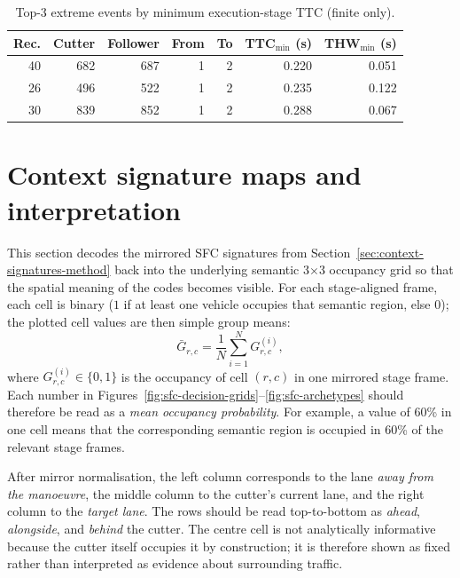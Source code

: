 \documentclass[12pt,a4paper,twoside,openright]{report}
\begin{document}
    \begin{table}[H]
        \centering
        \caption{Top-3 extreme events by minimum execution-stage TTC (finite only).}
        \label{tab:top-ttc}
        \begin{tabular}{@{}rrrrrrr@{}}
            \toprule
            Rec. & Cutter & Follower & From & To & TTC$_{\min}$ (s) & THW$_{\min}$ (s) \\
            \midrule
            40 & 682 & 687 & 1 & 2 & 0.220 & 0.051 \\
            26 & 496 & 522 & 1 & 2 & 0.235 & 0.122 \\
            30 & 839 & 852 & 1 & 2 & 0.288 & 0.067 \\
            \bottomrule
        \end{tabular}
    \end{table}

    \section{Context signature maps and interpretation}
    \label{sec:context-maps}
    This section decodes the mirrored SFC signatures from Section~\ref{sec:context-signatures-method} back into the underlying semantic 3$\times$3 occupancy grid so that the spatial meaning of the codes becomes visible. For each stage-aligned frame, each cell is binary ($1$ if at least one vehicle occupies that semantic region, else $0$); the plotted cell values are then simple group means:
    \[
        \bar{G}_{r,c} = \frac{1}{N}\sum_{i=1}^{N} G^{(i)}_{r,c},
    \]
    where $G^{(i)}_{r,c}\in\{0,1\}$ is the occupancy of cell $(r,c)$ in one mirrored stage frame. Each number in Figures~\ref{fig:sfc-decision-grids}--\ref{fig:sfc-archetypes} should therefore be read as a \emph{mean occupancy probability}. For example, a value of 60\% in one cell means that the corresponding semantic region is occupied in 60\% of the relevant stage frames.

    After mirror normalisation, the left column corresponds to the lane \emph{away from the manoeuvre}, the middle column to the cutter's current lane, and the right column to the \emph{target lane}. The rows should be read top-to-bottom as \emph{ahead}, \emph{alongside}, and \emph{behind} the cutter. The centre cell is not analytically informative because the cutter itself occupies it by construction; it is therefore shown as fixed rather than interpreted as evidence about surrounding traffic.
\end{document}

